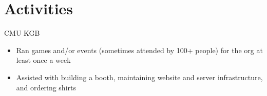 \documentclass[11pt,letterpaper,sans,final]{moderncv}
\begin{document}

\section{Activities}
    {CMU KGB}{}{}
    {
      \begin{itemize}
        \item Ran games and/or events (sometimes attended by 100+ people) for
          the org at least once a week
        \item Assisted with building a booth, maintaining website and server
          infrastructure, and ordering shirts
      \end{itemize}
    }
\end{document}
